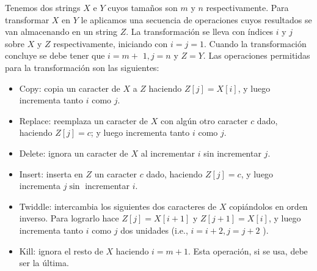 \begin{problema}
Tenemos dos strings $X$ e $Y$ cuyos tamaños son $m$ y $n$ respectivamente. Para transformar $X$ en $Y$ le aplicamos una secuencia de operaciones cuyos resultados se van almacenando en un string $Z$. La transformación se lleva con índices $i$ y $j$ sobre $X$ y $Z$ respectivamente, iniciando con $i=j=1$. Cuando la transformación concluye se debe tener que $i=m+$ $1, j=n$ y $Z=Y$. Las operaciones permitidas para la transformación son las siguientes:
\begin{itemize}
    \item Copy: copia un caracter de $X$ a $Z$ haciendo $Z[j]=X[i]$, y luego incrementa tanto $i$ como $j$.

    \item Replace: reemplaza un caracter de $X$ con algún otro caracter $c$ dado, haciendo $Z[j]=c$; y luego incrementa tanto $i$ como $j$.
    
    \item Delete: ignora un caracter de $X$ al incrementar $i$ sin incrementar $j$.
    
    \item Insert: inserta en $Z$ un caracter $c$ dado, haciendo $Z[j]=c$, y luego incrementa $j \sin$ incrementar $i$.
    
    \item Twiddle: intercambia los siguientes dos caracteres de $X$ copiándolos en orden inverso. Para lograrlo hace $Z[j]=X[i+1]$ y $Z[j+1]=X[i]$, y luego incrementa tanto $i$ como $j$ dos unidades (i.e., $i=i+2, j=j+2$ ).
    
    \item Kill: ignora el resto de $X$ haciendo $i=m+1$. Esta operación, si se usa, debe ser la última.
\end{itemize}




\end{problema}

